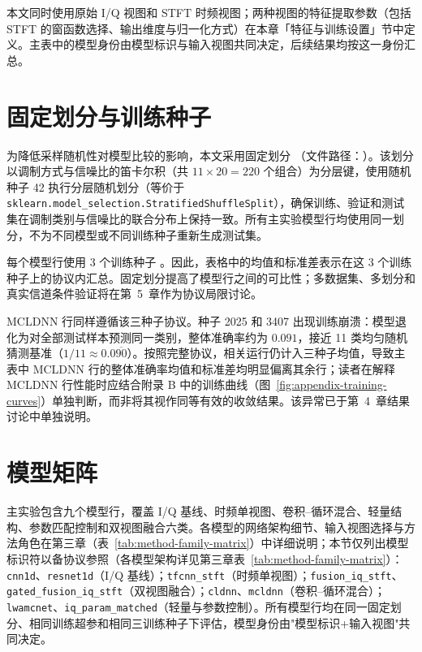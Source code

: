 本文同时使用原始 I/Q 视图和 STFT 时频视图；两种视图的特征提取参数（包括 STFT 的窗函数选择、输出维度与归一化方式）在本章「特征与训练设置」节中定义。主表中的模型身份由模型标识与输入视图共同决定，后续结果均按这一身份汇总。

\section{固定划分与训练种子}

为降低采样随机性对模型比较的影响，本文采用固定划分 \splitname{}（文件路径：）。该划分以调制方式与信噪比的笛卡尔积（共 $11\times20=220$ 个组合）为分层键，使用随机种子 42 执行分层随机划分（等价于 \texttt{sklearn.model\_selection.Strat\-ified\-Shuffle\-Split}），确保训练、验证和测试集在调制类别与信噪比的联合分布上保持一致。所有主实验模型行均使用同一划分，不为不同模型或不同训练种子重新生成测试集。

每个模型行使用 3 个训练种子 \mainseeds{}。因此，表格中的均值和标准差表示在这 3 个训练种子上的协议内汇总。固定划分提高了模型行之间的可比性；多数据集、多划分和真实信道条件验证将在第~5~章作为协议局限讨论。

MCLDNN 行同样遵循该三种子协议。种子 2025 和 3407 出现训练崩溃：模型退化为对全部测试样本预测同一类别，整体准确率约为 $0.091$，接近 11 类均匀随机猜测基准（$1/11\approx0.0\overline{90}$）。按照完整协议，相关运行仍计入三种子均值，导致主表中 MCLDNN 行的整体准确率均值和标准差均明显偏离其余行；读者在解释 MCLDNN 行性能时应结合附录 B 中的训练曲线（图~\ref{fig:appendix-training-curves}）单独判断，而非将其视作同等有效的收敛结果。该异常已于第~4~章结果讨论中单独说明。

\section{模型矩阵}

主实验包含九个模型行，覆盖 I/Q 基线、时频单视图、卷积--循环混合、轻量结构、参数匹配控制和双视图融合六类。各模型的网络架构细节、输入视图选择与方法角色在第三章（表~\ref{tab:method-family-matrix}）中详细说明；本节仅列出模型标识符以备协议参照（各模型架构详见第三章表~\ref{tab:method-family-matrix}）：\texttt{cnn1d}、\texttt{resnet1d}（I/Q 基线）；\texttt{tfcnn\_stft}（时频单视图）；\texttt{fusion\_iq\_stft}、\texttt{gated\_fusion\_iq\_stft}（双视图融合）；\texttt{cldnn}、\texttt{mcldnn}（卷积--循环混合）；\texttt{lwamcnet}、\texttt{iq\_param\_matched}（轻量与参数控制）。所有模型行均在同一固定划分、相同训练超参和相同三训练种子下评估，模型身份由"模型标识+输入视图"共同决定。

